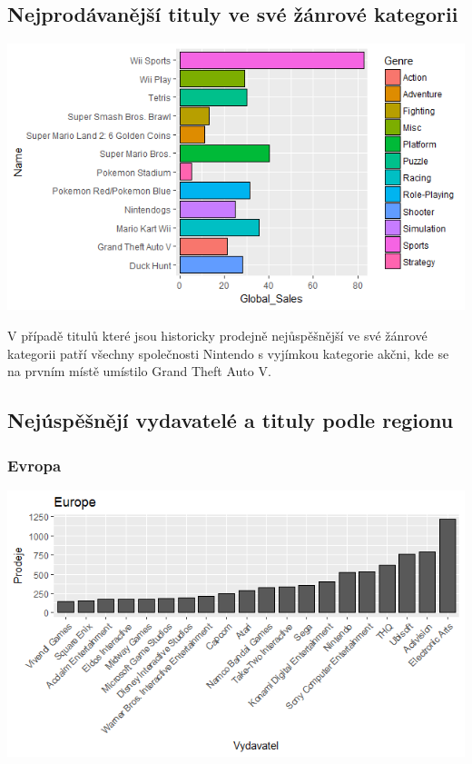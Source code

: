 \documentclass[a4paper,11pt]{article}
\begin{document}
\newpage

\subsection{Nejprodávanější tituly ve své žánrové kategorii}

\includegraphics[scale=0.9]{Rplot15}

V případě titulů které jsou historicky prodejně nejůspěšnější ve své žánrové kategorii patří všechny společnosti Nintendo s vyjímkou kategorie akčni, kde se na prvním místě umístilo Grand Theft Auto V.

\newpage

\subsection{Nejúspěšnějí vydavatelé a tituly podle regionu}

\subsubsection{Evropa}
\includegraphics[scale=0.8]{Rplot10}
\end{document}
